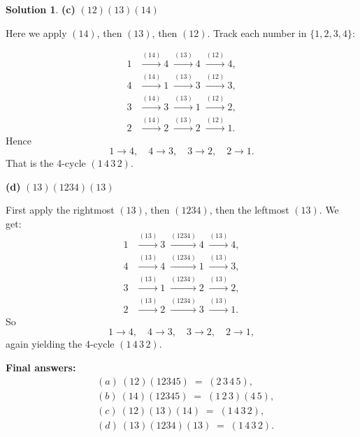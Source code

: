 \documentclass[12pt]{article}
\theoremstyle{definition} %
\newtheorem{solution}{Solution}
\theoremstyle{plain} %
\begin{document}
\begin{solution}
    \bigskip
    
    \noindent
    \textbf{(c) }$(12)(13)(14)$
    
    \medskip
    
    \noindent
    Here we apply $(14)$, then $(13)$, then $(12)$.  Track each number in $\{1,2,3,4\}$:
    
    \[
    \begin{aligned}
    1 &\xrightarrow{(14)} 4 \;\xrightarrow{(13)} 4 \;\xrightarrow{(12)} 4,\\
    4 &\xrightarrow{(14)} 1 \;\xrightarrow{(13)} 3 \;\xrightarrow{(12)} 3,\\
    3 &\xrightarrow{(14)} 3 \;\xrightarrow{(13)} 1 \;\xrightarrow{(12)} 2,\\
    2 &\xrightarrow{(14)} 2 \;\xrightarrow{(13)} 2 \;\xrightarrow{(12)} 1.
    \end{aligned}
    \]
    Hence
    \[
    1 \to 4,\quad 4 \to 3,\quad 3 \to 2,\quad 2 \to 1.
    \]
    That is the 4-cycle $(1\,4\,3\,2)$.
    
    \bigskip
    
    \noindent
    \textbf{(d) }$(13)(1234)(13)$
    
    \medskip
    
    \noindent
    First apply the rightmost $(13)$, then $(1234)$, then the leftmost $(13)$.  We get:
    \[
    \begin{aligned}
    1 &\xrightarrow{(13)} 3 \;\xrightarrow{(1234)} 4 \;\xrightarrow{(13)} 4,\\
    4 &\xrightarrow{(13)} 4 \;\xrightarrow{(1234)} 1 \;\xrightarrow{(13)} 3,\\
    3 &\xrightarrow{(13)} 1 \;\xrightarrow{(1234)} 2 \;\xrightarrow{(13)} 2,\\
    2 &\xrightarrow{(13)} 2 \;\xrightarrow{(1234)} 3 \;\xrightarrow{(13)} 1.
    \end{aligned}
    \]
    So
    \[
    1 \to 4,\quad 4 \to 3,\quad 3 \to 2,\quad 2 \to 1,
    \]
    again yielding the 4-cycle $(1\,4\,3\,2)$.
    
    \bigskip
    
    \noindent
    \textbf{Final answers:}
    \[
    \begin{aligned}
    &(a)\ (12)(12345) \;=\; (2\,3\,4\,5),\\
    &(b)\ (14)(12345) \;=\; (1\,2\,3)(4\,5),\\
    &(c)\ (12)(13)(14) \;=\; (1\,4\,3\,2),\\
    &(d)\ (13)(1234)(13) \;=\; (1\,4\,3\,2).
    \end{aligned}
    \]
     
\end{solution}
\end{document}
